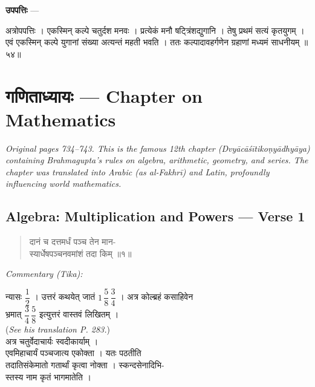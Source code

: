 \documentclass[11pt,a4paper]{article}
\newcommand{\dev}[1]{{\devanagarifont #1}}
\newcommand{\skt}[1]{{\devanagarifont\color{sktcolor} #1}}
\newenvironment{shloka}{%
  \begin{quote}%
  \smallskip%
  \devanagarifont\color{sktcolor}%
}{%
  \smallskip%
  \end{quote}%
}
\newenvironment{tika}{%
  \smallskip%
  \noindent\textit{Commentary (Tika):}\par%
  \smallskip%
  \hindifont\small%
}{%
  \par\smallskip%
}
\newenvironment{upapatti}{%
  \smallskip%
  \noindent\textbf{\devanagarifont उपपत्तिः} — \devanagarifont\small%
}{%
  \par\smallskip%
}
\newcommand{\ednote}[1]{\textcolor{notecolor}{\textit{#1}}}
\begin{document}
\vspace{0.3cm}
\begin{upapatti}
\skt{अत्रोपपत्तिः} । एकस्मिन् कल्पे चतुर्दश मनवः । प्रत्येकं मनौ षट्त्रिंशद्युगानि । तेषु प्रथमं सत्यं कृतयुगम् । एवं एकस्मिन् कल्पे युगानां संख्या अत्यन्तं महती भवति । ततः कल्पादावहर्गणेन ग्रहाणां मध्यमं साधनीयम् ॥५४॥
\end{upapatti}

\newpage
\section[गणिताध्यायः]{\dev{गणिताध्यायः} — Chapter on Mathematics}
\label{sec:ganita}

\ednote{Original pages 734--743. This is the famous 12th chapter (Dvyācāśītikoṇyādhyāya) containing Brahmagupta's rules on algebra, arithmetic, geometry, and series. The chapter was translated into Arabic (as \textit{al-Fakhrī}) and Latin, profoundly influencing world mathematics.}

\subsection*{Algebra: Multiplication and Powers — Verse 1}

\begin{shloka}
\skt{दानं च दत्तमर्धं पञ्च तेन मान-}\\
\skt{स्यार्धेषपञ्चनवमांशं तदा किम्} ॥१॥
\end{shloka}

\vspace{0.3cm}
\begin{tika}
\skt{न्यासः} $\dfrac{1}{2}$ । \skt{उत्तरं कथयेत् जातं} $1\,\dfrac{5}{8}\,\dfrac{3}{4}$ । \skt{अत्र कोल्ब्रहं कसाहिवेन}\\
\skt{भ्रमात्} $\dfrac{3}{4}\,\dfrac{5}{8}$ \skt{इत्युत्तरं वास्तवं लिखितम् ।}\\
(\textit{See his translation P. 283.})\\[0.5em]
अत्र चतुर्वेदाचार्यः \skt{स्वदीकार्याम्} ।\\
\skt{एवमिहाचार्यं पञ्चजात्य एकोक्ता । यतः पठतीति}\\
\skt{तदातिसंकेमातो गतार्थां कृत्वा नोक्ता । स्कन्दसेनादिभि-}\\
\skt{स्तस्य नाम कृतं भागमातेति} ।
\end{tika}
\end{document}
